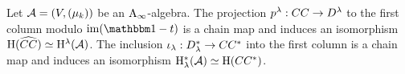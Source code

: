 \documentclass[\MainFolder/Text.tex]{subfiles}
\begin{document}
\begin{Lemma}\label{Lem:LodCycBiCycHom}
Let $\mathcal{A} = (V,(\mu_k))$ be an $\mathrm{A}_\infty$-algebra. The projection $p^\lambda: CC \rightarrow D^\lambda$ to the first column modulo $\im(\Id-\CycPermOp)$ is a chain map and induces an isomorphism $\mathrm{H}(\widehat{CC}) \simeq \mathrm{H}^\lambda(\mathcal{A})$. The inclusion $\iota_\lambda: D_\lambda^{*} \rightarrow CC^{*}$ into the first column is a chain map and induces an isomorphism $\mathrm{H}_\lambda^*(\mathcal{A}) \simeq \mathrm{H}(CC^*)$.
\end{Lemma}
\end{document}
